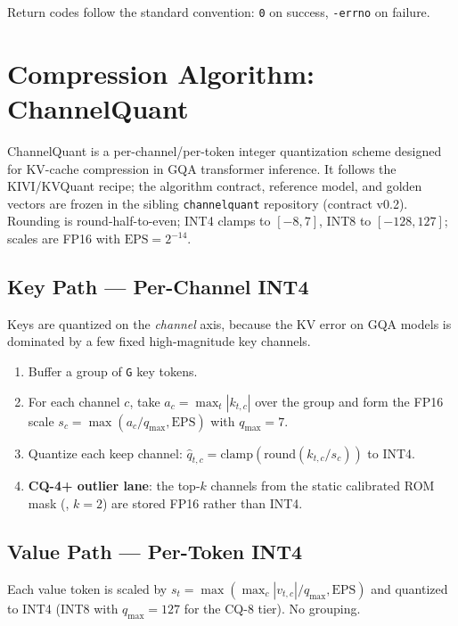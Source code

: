 \documentclass[11pt]{article}
\begin{document}
\noindent Return codes follow the standard convention: \texttt{0} on success,
\texttt{-errno} on failure.

\section{Compression Algorithm: ChannelQuant}
\label{sec:algorithm}

ChannelQuant is a per-channel/per-token integer quantization scheme designed for
KV-cache compression in GQA transformer inference. It follows the KIVI/KVQuant
recipe; the algorithm contract, reference model, and golden vectors are frozen in
the sibling \texttt{channelquant} repository (contract v0.2). Rounding is
round-half-to-even; INT4 clamps to $[-8,7]$, INT8 to $[-128,127]$; scales are
FP16 with $\text{EPS}=2^{-14}$.

\subsection{Key Path --- Per-Channel INT4}
Keys are quantized on the \emph{channel} axis, because the KV error on GQA models
is dominated by a few fixed high-magnitude key channels.
\begin{enumerate}
\item Buffer a group of \texttt{G} key tokens.
\item For each channel $c$, take $a_c = \max_t |k_{t,c}|$ over the group and form
      the FP16 scale $s_c = \max(a_c / q_{\max}, \text{EPS})$ with $q_{\max}=7$.
\item Quantize each keep channel: $\hat{q}_{t,c} =
      \mathrm{clamp}(\mathrm{round}(k_{t,c}/s_c))$ to INT4.
\item \textbf{CQ-4+ outlier lane}: the top-$k$ channels from the static calibrated
      ROM mask (, $k=2$) are stored FP16
      rather than INT4.
\end{enumerate}

\subsection{Value Path --- Per-Token INT4}
Each value token is scaled by $s_t=\max(\max_c|v_{t,c}|/q_{\max},\text{EPS})$ and
quantized to INT4 (INT8 with $q_{\max}=127$ for the CQ-8 tier). No grouping.
\end{document}
